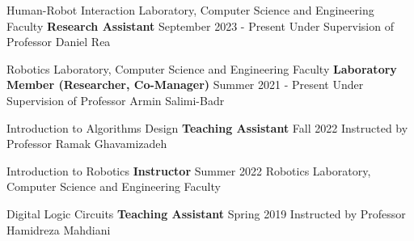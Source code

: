 \begin{cventries}

    \cventry
    {Human-Robot Interaction Laboratory, Computer Science and Engineering Faculty}
    {\bullet \space \textbf {Research Assistant}}
    {}
    {September 2023 - Present}
    {Under Supervision of Professor Daniel Rea}
    \vspace{0.4 cm}

    \cventry
    {Robotics Laboratory, Computer Science and Engineering Faculty}
    {\bullet \space \textbf {Laboratory Member (Researcher, Co-Manager)}}
    {}
    {Summer 2021 - Present}
    {Under Supervision of Professor Armin Salimi-Badr}
    \vspace{0.4 cm}

    \cventry
    {Introduction to Algorithms Design}
    {\bullet \space \textbf {Teaching Assistant}}
    {}
    {Fall 2022}
    {Instructed by Professor Ramak Ghavamizadeh}
    \vspace{0.4 cm}
    
    \cventry
    {Introduction to Robotics}
    {\bullet \space \textbf {Instructor}}
    {}
    {Summer 2022}
    {Robotics Laboratory, Computer Science and Engineering Faculty}
    \vspace{0.4 cm}
    
    \cventry
    {Digital Logic Circuits}
    {\bullet \space \textbf {Teaching Assistant}}
    {}
    {Spring 2019}
    {Instructed by Professor Hamidreza Mahdiani}
    
\end{cventries}
